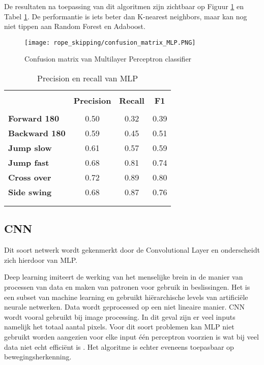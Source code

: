 De resultaten na toepassing van dit algoritmen zijn zichtbaar op Figuur \ref{fig:MLP} en Tabel \ref{tab:MLP}. De performantie is iets beter dan K-nearest neighbors, maar kan nog niet tippen aan Random Forest en Adaboost.

\begin{figure}[!htpd]
\centering
\caption{Confusion matrix van Multilayer Perceptron classifier}\label{fig:MLP}
\texttt{[image: rope\_skipping/confusion\_matrix\_MLP.PNG]} 
\end{figure}

\begin{table}[!htpd]
  \centering
  \caption{Precision en recall van MLP}
  \label{tab:MLP}
\begin{tabular}{lccc}
 \hline \\
\textbf{}             & \textbf{Precision} & \textbf{Recall} & \textbf{F1} &  \\
\hline \\
\textbf{Forward 180}  & 0.50               & 0.32            & 0.39        &  \\
\textbf{Backward 180} & 0.59               & 0.45            & 0.51        &  \\
\textbf{Jump slow}    & 0.61               & 0.57            & 0.59        &  \\
\textbf{Jump fast}    & 0.68               & 0.81            & 0.74        &  \\
\textbf{Cross over}   & 0.72               & 0.89            & 0.80        &  \\
\textbf{Side swing}   & 0.68               & 0.87            & 0.76        & \\\\
\hline \\
\end{tabular}
\end{table}

\subsection{CNN} \label{subsectie:cnn}
Dit soort netwerk wordt gekenmerkt door de Convolutional Layer en onderscheidt zich hierdoor van MLP.

Deep learning imiteert de werking van het menselijke brein in de manier van processen van data en maken van patronen voor gebruik in beslissingen. Het is een subset van machine learning en gebruikt hiërarchische levels van artificiële neurale netwerken. Data wordt geprocessed op een niet lineaire manier.
CNN wordt vooral gebruikt bij image processing. In dit geval zijn er veel inputs namelijk het totaal aantal pixels. Voor dit soort problemen kan MLP niet gebruikt worden aangezien voor elke input één perceptron voorzien is wat bij veel data niet echt efficiënt is \citep{ref2}. Het algoritme is echter eveneens toepasbaar op bewegingsherkenning.

